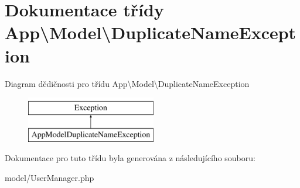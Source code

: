 \hypertarget{classApp_1_1Model_1_1DuplicateNameException}{\section{Dokumentace třídy App\textbackslash{}Model\textbackslash{}Duplicate\-Name\-Exception}
\label{classApp_1_1Model_1_1DuplicateNameException}
}
Diagram dědičnosti pro třídu App\textbackslash{}Model\textbackslash{}Duplicate\-Name\-Exception\begin{figure}[H]
\begin{center}
\leavevmode
\includegraphics[height=2.000000cm]{classApp_1_1Model_1_1DuplicateNameException}
\end{center}
\end{figure}


Dokumentace pro tuto třídu byla generována z následujícího souboru\-:\begin{DoxyCompactItemize}
\item 
model/User\-Manager.\-php\end{DoxyCompactItemize}
